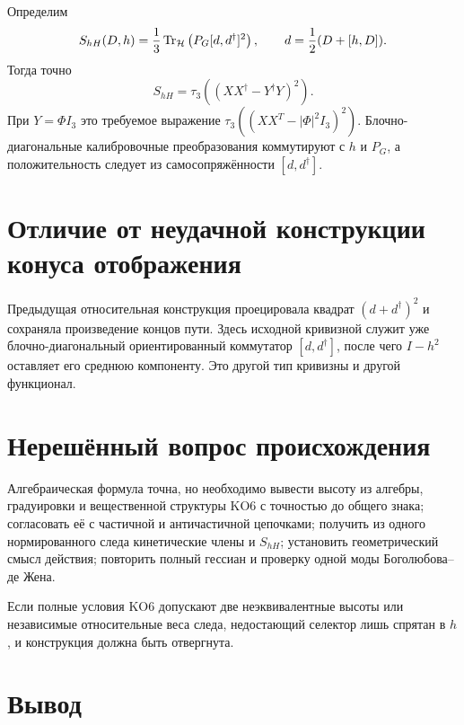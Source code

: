 Определим
\begin{equation}
 S_{hH}(D,h)=\frac13\operatorname{Tr}_{\mathcal H}
 \left(P_G[d,d^\dagger]^2\right),
 \qquad d=\frac12(D+[h,D]).
 \label{eq:v5-height-hodge-action}
\end{equation}
Тогда точно
\begin{equation}
 \boxed{S_{hH}=\tau_3\left((XX^\dagger-Y^\dagger Y)^2\right).}
 \label{eq:v5-height-hodge-exact-target}
\end{equation}
При \(Y=\Phi I_3\) это требуемое выражение
\(\tau_3((XX^T-|\Phi|^2I_3)^2)\). Блочно-диагональные калибровочные
преобразования коммутируют с \(h\) и \(P_G\), а положительность следует из
самосопряжённости \([d,d^\dagger]\).

\section{Отличие от неудачной конструкции конуса отображения}

Предыдущая относительная конструкция проецировала квадрат
\((d+d^\dagger)^2\) и сохраняла произведение концов пути. Здесь исходной
кривизной служит уже блочно-диагональный ориентированный коммутатор
\([d,d^\dagger]\), после чего \(I-h^2\) оставляет его среднюю компоненту.
Это другой тип кривизны и другой функционал.

\section{Нерешённый вопрос происхождения}

Алгебраическая формула точна, но необходимо вывести высоту из алгебры,
градуировки и вещественной структуры KO6 с точностью до общего знака;
согласовать её с частичной и античастичной цепочками; получить из одного
нормированного следа кинетические члены и \(S_{hH}\); установить
геометрический смысл действия; повторить полный гессиан и проверку одной
моды Боголюбова--де Жена.

\begin{nogocriterion}
Если полные условия KO6 допускают две неэквивалентные высоты или независимые
относительные веса следа, недостающий селектор лишь спрятан в \(h\), и
конструкция должна быть отвергнута.
\end{nogocriterion}

\section{Вывод}

